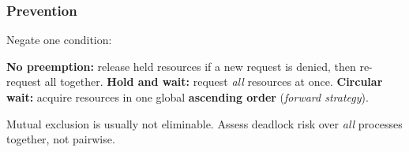 \subsubsection{Prevention} 
Negate one condition:
\begin{outline}
  \1 \textbf{No preemption:} release held resources if a new request is denied, then re-request all together.
  \1 \textbf{Hold and wait:} request \emph{all} resources at once.
  \1 \textbf{Circular wait:} acquire resources in one global \textbf{ascending order} (\emph{forward strategy}).
\end{outline}
Mutual exclusion is usually not eliminable. 
Assess deadlock risk over \emph{all} processes together, not pairwise.

